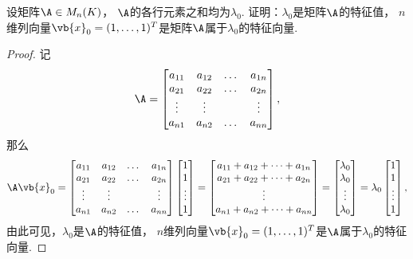 \begin{example}\label{example:特征值与特征向量.各行元素之和相同的矩阵的特征值与特征向量}
设矩阵\(\A \in M_n(K)\)，
\(\A\)的各行元素之和均为\(\lambda_0\).
证明：\(\lambda_0\)是矩阵\(\A\)的特征值，
\(n\)维列向量\(\vb{x}_0=(1,\dotsc,1)^T\)是矩阵\(\A\)属于\(\lambda_0\)的特征向量.
\begin{proof}
记\[
	\A
	= \begin{bmatrix}
		a_{11} & a_{12} & \dots & a_{1n} \\
		a_{21} & a_{22} & \dots & a_{2n} \\
		\vdots & \vdots & & \vdots \\
		a_{n1} & a_{n2} & \dots & a_{nn}
	\end{bmatrix},
\]
那么\[
	\A \vb{x}_0
	= \begin{bmatrix}
		a_{11} & a_{12} & \dots & a_{1n} \\
		a_{21} & a_{22} & \dots & a_{2n} \\
		\vdots & \vdots & & \vdots \\
		a_{n1} & a_{n2} & \dots & a_{nn}
	\end{bmatrix}
	\begin{bmatrix}
		1 \\ 1 \\ \vdots \\ 1
	\end{bmatrix}
	= \begin{bmatrix}
		a_{11} + a_{12} + \dotsb + a_{1n} \\
		a_{21} + a_{22} + \dotsb + a_{2n} \\
		\vdots \\
		a_{n1} + a_{n2} + \dotsb + a_{nn}
	\end{bmatrix}
	= \begin{bmatrix}
		\lambda_0 \\ \lambda_0 \\ \vdots \\ \lambda_0
	\end{bmatrix}
	= \lambda_0
	\begin{bmatrix}
		1 \\ 1 \\ \vdots \\ 1
	\end{bmatrix},
\]
由此可见，\(\lambda_0\)是\(\A\)的特征值，
\(n\)维列向量\(\vb{x}_0=(1,\dotsc,1)^T\)是\(\A\)属于\(\lambda_0\)的特征向量.
\end{proof}
\end{example}


